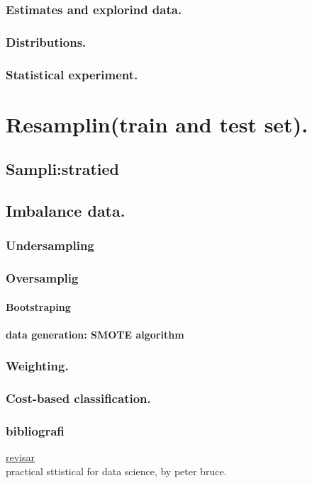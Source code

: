 \documentclass[12pt, a4paper]{book}
\begin{document}
\section{Estimates and explorind data.}
\section{Distributions.}
\section{Statistical experiment.}



\part{Resamplin(train and test set).}

\chapter{Sampli:stratied}

\chapter{Imbalance data.}

\section{Undersampling}

\section{Oversamplig}
\subsection{Bootstraping}
\subsection{data generation: SMOTE algorithm}
\section{Weighting.}
\section{Cost-based classification.}


\section{bibliografi} 
\href{https://www.analyticsvidhya.com/blog/2016/03/practical-guide-deal-imbalanced-classification-problems/}{revisar}\\
practical sttistical for data science, by peter bruce.\\
\end{document}

